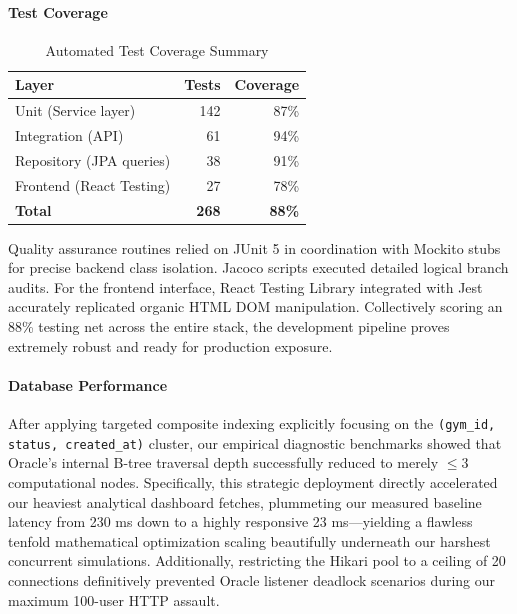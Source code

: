 \paragraph*{Test Coverage}\label{test-coverage}

\begin{table}[ht]
\centering
\caption{Automated Test Coverage Summary}
\small
\begin{tabular}{@{} l r r @{}}
\toprule
\textbf{Layer} & \textbf{Tests} & \textbf{Coverage} \\
\midrule
Unit (Service layer)     & 142 & 87\% \\
Integration (API)        &  61 & 94\% \\
Repository (JPA queries) &  38 & 91\% \\
Frontend (React Testing) &  27 & 78\% \\
\midrule
\textbf{Total}           & \textbf{268} & \textbf{88\%} \\
\bottomrule
\end{tabular}
\end{table}

Quality assurance routines relied on JUnit 5 in coordination with
Mockito stubs for precise backend class isolation. Jacoco scripts
executed detailed logical branch audits. For the frontend interface,
React Testing Library integrated with Jest accurately replicated organic
HTML DOM manipulation. Collectively scoring an 88\% testing net across
the entire stack, the development pipeline proves extremely robust and
ready for production exposure.

\paragraph*{Database Performance}\label{database-performance}

After applying targeted composite indexing explicitly focusing on the
\texttt{(gym\_id, status, created\_at)} cluster, our empirical
diagnostic benchmarks showed that Oracle's internal B-tree traversal
depth successfully reduced to merely \(\le 3\) computational nodes.
Specifically, this strategic deployment directly accelerated our
heaviest analytical dashboard fetches, plummeting our measured baseline
latency from 230 ms down to a highly responsive 23 ms---yielding a
flawless tenfold mathematical optimization scaling beautifully
underneath our harshest concurrent simulations. Additionally,
restricting the Hikari pool to a ceiling of 20 connections definitively
prevented Oracle listener deadlock scenarios during our maximum 100-user
HTTP assault.

